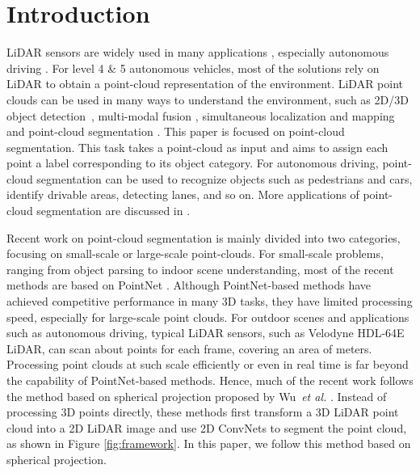\documentclass[runningheads]{llncs}
\begin{document}
\section{Introduction}
\label{intro}
LiDAR sensors are widely used in many applications  \cite{xie2019review}, especially autonomous driving \cite{geiger2013vision,wu2017squeezeseg,behley2019iccv}. For level 4 \& 5 autonomous vehicles, most of the solutions rely on LiDAR to obtain a point-cloud representation of the environment. LiDAR point clouds can be used in many ways to understand the environment, such as 2D/3D object detection~\cite{zhou2018voxelnet,chen2017multi,song2016deep,qi2018frustum}, multi-modal fusion \cite{zhou2019end,jaritz2019xmuda}, simultaneous localization and mapping \cite{chen2019suma++,behley2018efficient} and point-cloud segmentation \cite{wu2017squeezeseg,wu2018squeezesegv2,qi2017pointnet}. This paper is focused on point-cloud segmentation. This task takes a point-cloud as input and aims to assign each point a label corresponding to its object category. For autonomous driving, point-cloud segmentation can be used to recognize objects such as pedestrians and cars, identify drivable areas, detecting lanes, and so on. More applications of point-cloud segmentation are discussed in \cite{xie2019review}. 

Recent work on point-cloud segmentation is mainly divided into two categories, focusing on small-scale or large-scale point-clouds. For small-scale problems, ranging from object parsing to indoor scene understanding, most of the recent methods are based on PointNet \cite{qi2017pointnet,qi2017pointnet++}. Although PointNet-based methods have achieved competitive performance in many 3D tasks, they have limited processing speed, especially for large-scale point clouds. For outdoor scenes and applications such as autonomous driving, typical LiDAR sensors, such as Velodyne HDL-64E LiDAR, can scan about  points for each frame, covering an area of  meters. Processing point clouds at such scale efficiently or even in real time is far beyond the capability of PointNet-based methods. Hence, much of the recent work follows the method based on spherical projection proposed by Wu~\textit{et al.} \cite{wu2017squeezeseg,wu2018squeezesegv2}. Instead of processing 3D points directly, these methods first transform a 3D LiDAR point cloud into a 2D LiDAR image and use 2D ConvNets to segment the point cloud, as shown in Figure \ref{fig:framework}. In this paper, we follow this method based on spherical projection.  
\end{document}
